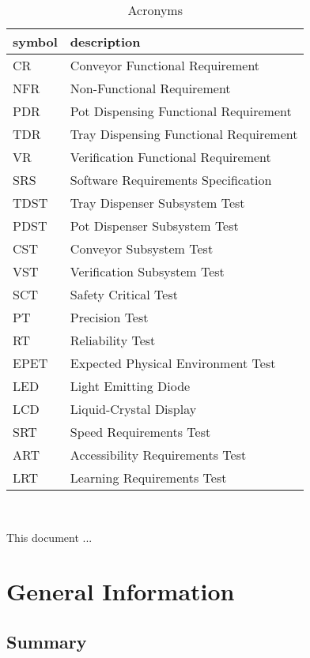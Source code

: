 \documentclass[12pt, titlepage]{article}
\begin{document}
\renewcommand{\arraystretch}{1.2}
\begin{table}[ht]
\begin{tabular}{l l} 
  \toprule		
  \textbf{symbol} & \textbf{description}\\
  \midrule 
  CR & Conveyor Functional Requirement\\
  NFR & Non-Functional Requirement\\
  PDR & Pot Dispensing Functional Requirement\\
  TDR & Tray Dispensing Functional Requirement\\
  VR & Verification Functional Requirement\\
  SRS & Software Requirements Specification\\
  TDST & Tray Dispenser Subsystem Test\\
  PDST & Pot Dispenser Subsystem Test\\
  CST & Conveyor Subsystem Test\\
  VST & Verification Subsystem Test\\
  SCT & Safety Critical Test\\
  PT & Precision Test\\
  RT & Reliability Test\\
  EPET & Expected Physical Environment Test\\
  LED & Light Emitting Diode\\
  LCD & Liquid-Crystal Display\\
  SRT & Speed Requirements Test\\
  ART & Accessibility Requirements Test\\
  LRT & Learning Requirements Test\\

  \bottomrule
\end{tabular}\\
\caption{Acronyms}
\label{tab:title}
\end{table}



\newpage


This document ... 

\section{General Information}

\subsection{Summary}
\end{document}
